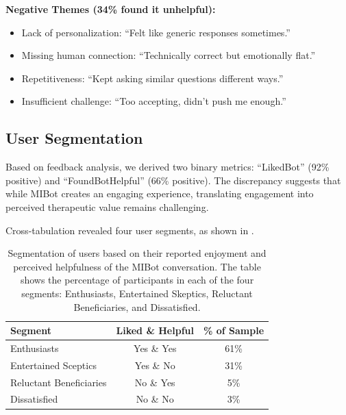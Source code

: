 \textbf{Negative Themes (34\% found it unhelpful):}
\begin{itemize}
	\item Lack of personalization: ``Felt like generic responses sometimes.''
	\item Missing human connection: ``Technically correct but emotionally flat.''
	\item Repetitiveness: ``Kept asking similar questions different ways.''
	\item Insufficient challenge: ``Too accepting, didn't push me enough.''
\end{itemize}

\subsection*{User Segmentation}

Based on feedback analysis, we derived two binary metrics: ``LikedBot'' (92\% positive) and ``FoundBotHelpful'' (66\% positive). The discrepancy suggests that while MIBot creates an engaging experience, translating engagement into perceived therapeutic value remains challenging.

Cross-tabulation revealed four user segments, as shown in .

\begin{table}[ht]
	\centering
	\small
	\setlength{\tabcolsep}{4pt}
	\renewcommand{\arraystretch}{1.1}
	\begin{tabular}{@{}lcc@{}}
		\toprule
		\textbf{Segment}        & \textbf{Liked \& Helpful} & \textbf{\% of Sample} \\
		\midrule
		Enthusiasts             & Yes \& Yes                & 61\%                  \\
		Entertained Sceptics    & Yes \& No                 & 31\%                  \\
		Reluctant Beneficiaries & No \& Yes                 & 5\%                   \\
		Dissatisfied            & No \& No                  & 3\%                   \\
		\bottomrule
	\end{tabular}
	\caption[Segmentation of MIBot Participants based on their Experiences]{Segmentation of users based on their reported enjoyment and perceived helpfulness of the MIBot conversation. The table shows the percentage of participants in each of the four segments: Enthusiasts, Entertained Skeptics, Reluctant Beneficiaries, and Dissatisfied.}
	\label{table:user_segments}
\end{table}


